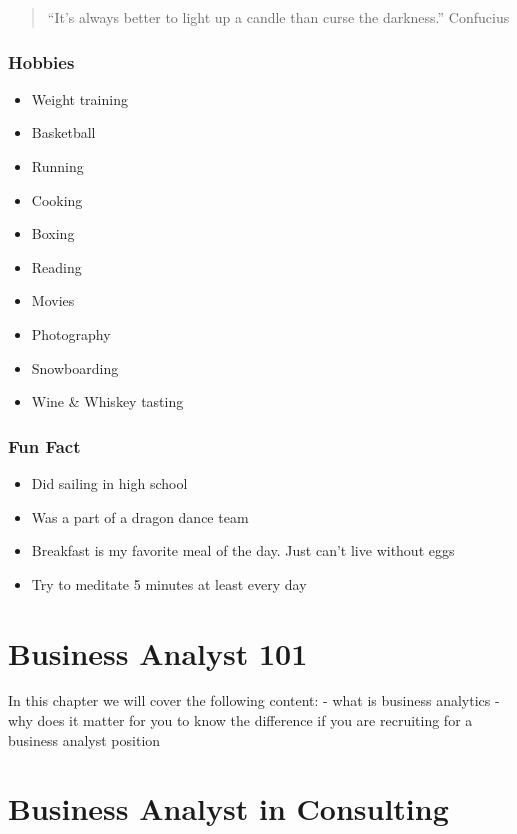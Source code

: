 \documentclass[
]{book}
\providecommand{\tightlist}{%
  \setlength{\itemsep}{0pt}\setlength{\parskip}{0pt}}
\begin{document}
\begin{quote}
``It's always better to light up a candle than curse the darkness.'' Confucius
\end{quote}

\hypertarget{hobbies}{%
\subsection{Hobbies}\label{hobbies}}

\begin{itemize}
\tightlist
\item
  Weight training
\item
  Basketball
\item
  Running
\item
  Cooking
\item
  Boxing
\item
  Reading
\item
  Movies
\item
  Photography
\item
  Snowboarding
\item
  Wine \& Whiskey tasting
\end{itemize}

\hypertarget{fun-fact}{%
\subsection{Fun Fact}\label{fun-fact}}

\begin{itemize}
\tightlist
\item
  Did sailing in high school
\item
  Was a part of a dragon dance team
\item
  Breakfast is my favorite meal of the day. Just can't live without eggs
\item
  Try to meditate 5 minutes at least every day
\end{itemize}

\hypertarget{business-analyst-101}{%
\chapter{Business Analyst 101}\label{business-analyst-101}}

In this chapter we will cover the following content:
- what is business analytics
- why does it matter for you to know the difference if you are recruiting for a business analyst position

\hypertarget{business-analyst-in-consulting}{%
\chapter{Business Analyst in Consulting}\label{business-analyst-in-consulting}}
\end{document}

